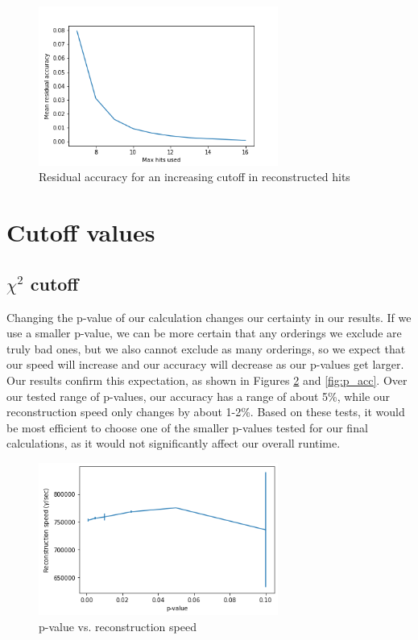 \begin{figure}
    \centering
    \includegraphics[width=0.7\textwidth]{graphs/mean_resid_acc.png}
    \caption{Residual accuracy for an increasing cutoff in reconstructed hits}
    \label{fig:hits_v_hitsUsed_resids}
\end{figure}

\section{Cutoff values}
\subsection{$\chi^2$ cutoff}
Changing the p-value of our calculation changes our certainty in our results. If we use a smaller p-value, we can be more certain that any orderings we exclude are truly bad ones, but we also cannot exclude as many orderings, so we expect that our speed will increase and our accuracy will decrease as our p-values get larger. Our results confirm this expectation, as shown in Figures \ref{fig:p_speed} and \ref{fig:p_acc}. Over our tested range of p-values, our accuracy has a range of about 5\%, while our reconstruction speed only changes by about 1-2\%. Based on these tests, it would be most efficient to choose one of the smaller p-values tested for our final calculations, as it would not significantly affect our overall runtime.

\begin{figure}
    \centering
    \includegraphics[width=0.7\textwidth]{graphs/pi_p_speed.png}
    \caption{p-value vs. reconstruction speed}
    \label{fig:p_speed}
\end{figure}

